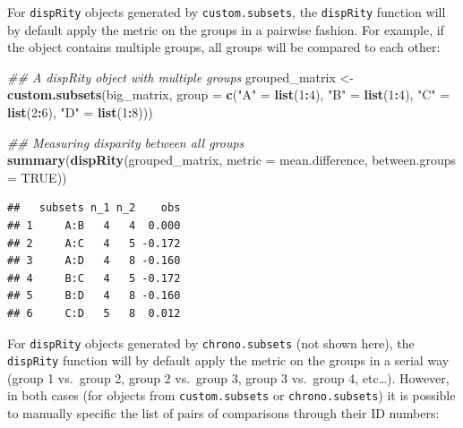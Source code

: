 \documentclass[
]{book}
\newenvironment{Shaded}{\begin{snugshade}}{\end{snugshade}}
\newcommand{\CommentTok}[1]{\textcolor[rgb]{0.56,0.35,0.01}{\textit{#1}}}
\newcommand{\DataTypeTok}[1]{\textcolor[rgb]{0.13,0.29,0.53}{#1}}
\newcommand{\DecValTok}[1]{\textcolor[rgb]{0.00,0.00,0.81}{#1}}
\newcommand{\KeywordTok}[1]{\textcolor[rgb]{0.13,0.29,0.53}{\textbf{#1}}}
\newcommand{\NormalTok}[1]{#1}
\newcommand{\OperatorTok}[1]{\textcolor[rgb]{0.81,0.36,0.00}{\textbf{#1}}}
\newcommand{\OtherTok}[1]{\textcolor[rgb]{0.56,0.35,0.01}{#1}}
\newcommand{\StringTok}[1]{\textcolor[rgb]{0.31,0.60,0.02}{#1}}
\begin{document}
For \texttt{dispRity} objects generated by \texttt{custom.subsets}, the \texttt{dispRity} function will by default apply the metric on the groups in a pairwise fashion.
For example, if the object contains multiple groups, all groups will be compared to each other:

\begin{Shaded}
\begin{Highlighting}[]
\CommentTok{\#\# A dispRity object with multiple groups}
\NormalTok{grouped\_matrix \textless{}{-}}\StringTok{ }\KeywordTok{custom.subsets}\NormalTok{(big\_matrix,}
                                 \DataTypeTok{group =} \KeywordTok{c}\NormalTok{(}\StringTok{"A"}\NormalTok{ =}\StringTok{ }\KeywordTok{list}\NormalTok{(}\DecValTok{1}\OperatorTok{:}\DecValTok{4}\NormalTok{),}
                                           \StringTok{"B"}\NormalTok{ =}\StringTok{ }\KeywordTok{list}\NormalTok{(}\DecValTok{1}\OperatorTok{:}\DecValTok{4}\NormalTok{),}
                                           \StringTok{"C"}\NormalTok{ =}\StringTok{ }\KeywordTok{list}\NormalTok{(}\DecValTok{2}\OperatorTok{:}\DecValTok{6}\NormalTok{), }
                                           \StringTok{"D"}\NormalTok{ =}\StringTok{ }\KeywordTok{list}\NormalTok{(}\DecValTok{1}\OperatorTok{:}\DecValTok{8}\NormalTok{)))}

\CommentTok{\#\# Measuring disparity between all groups}
\KeywordTok{summary}\NormalTok{(}\KeywordTok{dispRity}\NormalTok{(grouped\_matrix, }\DataTypeTok{metric =}\NormalTok{ mean.difference,}
                 \DataTypeTok{between.groups =} \OtherTok{TRUE}\NormalTok{))}
\end{Highlighting}
\end{Shaded}

\begin{verbatim}
##   subsets n_1 n_2    obs
## 1     A:B   4   4  0.000
## 2     A:C   4   5 -0.172
## 3     A:D   4   8 -0.160
## 4     B:C   4   5 -0.172
## 5     B:D   4   8 -0.160
## 6     C:D   5   8  0.012
\end{verbatim}

For \texttt{dispRity} objects generated by \texttt{chrono.subsets} (not shown here), the \texttt{dispRity} function will by default apply the metric on the groups in a serial way (group 1 vs.~group 2, group 2 vs.~group 3, group 3 vs.~group 4, etc\ldots).
However, in both cases (for objects from \texttt{custom.subsets} or \texttt{chrono.subsets}) it is possible to manually specific the list of pairs of comparisons through their ID numbers:
\end{document}
